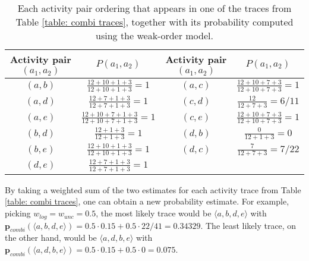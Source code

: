 % 
%
%
%
%
%
%
%
\begin{table}[h]

	\centering
	\begin{tabular}{cccc}
		\textbf{Activity pair $(a_1,a_2)$} & \textbf{$P(a_1,a_2)$} & \textbf{Activity pair $(a_1,a_2)$} & \textbf{$P(a_1,a_2)$}
		\\ \hline
	\multicolumn{1}{|c|}{$(a,b)$} & 
	\multicolumn{1}{|c|}{$\frac{12+10+1+3}{12+10+1+3} = 1$} & 
	\multicolumn{1}{|c|}{$(a,c)$} &
	\multicolumn{1}{|c|}{$\frac{12+10+7+3}{12+10+7+3} = 1$}
\\ \hline
	\multicolumn{1}{|c|}{$(a,d)$} & 
	\multicolumn{1}{|c|}{$\frac{12+7+1+3}{12+7+1+3} = 1$} & 
	\multicolumn{1}{|c|}{$(c,d)$} &
	\multicolumn{1}{|c|}{$\frac{12}{12+7+3} = 6/11$}
\\ \hline
	\multicolumn{1}{|c|}{$(a,e)$} & 
	\multicolumn{1}{|c|}{$\frac{12+10+7+1+3}{12+10+7+1+3} = 1$} & 
	\multicolumn{1}{|c|}{$(c,e)$} &
	\multicolumn{1}{|c|}{$\frac{12+10+7+3}{12+10+7+3} = 1$}
\\ \hline
	\multicolumn{1}{|c|}{$(b,d)$} & 
	\multicolumn{1}{|c|}{$\frac{12+1+3}{12+1+3} = 1$} & 
	\multicolumn{1}{|c|}{$(d,b)$} &
	\multicolumn{1}{|c|}{$\frac{0}{12+1+3} = 0$}
\\ \hline
	\multicolumn{1}{|c|}{$(b,e)$} & 
	\multicolumn{1}{|c|}{$\frac{12+10+1+3}{12+10+1+3} = 1$} & 
	\multicolumn{1}{|c|}{$(d,c)$} &
	\multicolumn{1}{|c|}{$\frac{7}{12+7+3} = 7/22$}
\\ \hline
	\multicolumn{1}{|c|}{$(d,e)$} & 
	\multicolumn{1}{|c|}{$\frac{12+7+1+3}{12+7+1+3} = 1$} & 
	\multicolumn{1}{|c|}{} &
	\multicolumn{1}{|c|}{}
\\ \hline


	\end{tabular}
	\caption{Each activity pair ordering that appears in one of the traces from Table \ref{table: combi traces}, together with its probability computed using the weak-order model.}
	\label{table: combi pairs}
\end{table} 
% 
%
%
\newline
By taking a weighted sum of the two estimates for each activity trace from Table \ref{table: combi traces}, one can obtain a new probability estimate.
For example, picking $w_{log} = w_{unc} = 0.5$, the most likely trace would be $\langle a,b,d,e \rangle$ with $\textbf{p}_{combi}(\langle a,b,d,e \rangle) = 0.5 \cdot 0.15 + 0.5 \cdot 22/41 = 0.34329$.
The least likely trace, on the other hand, would be $\langle a,d,b,e \rangle$ with $\textbf{p}_{combi}(\langle a,d,b,e \rangle) = 0.5 \cdot 0.15 + 0.5 \cdot 0 = 0.075$.

